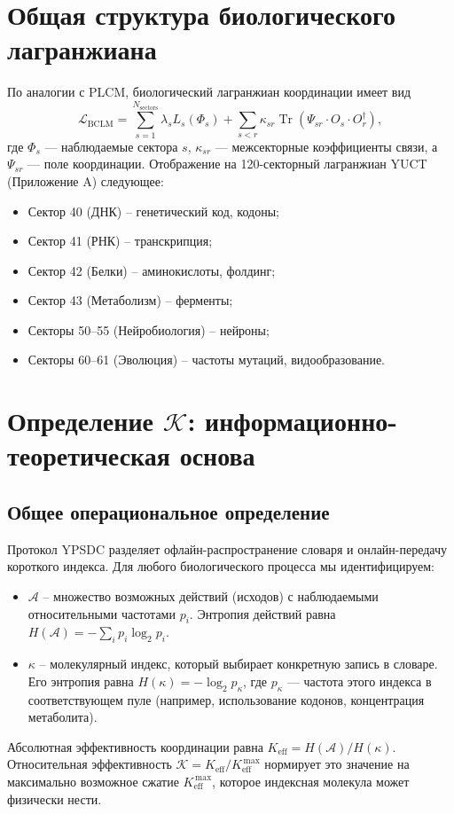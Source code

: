 \documentclass[12pt,a4paper]{article}
\newcommand{\REL}{\mathcal{K}}          %
\newcommand{\ABS}{K_{\mathrm{eff}}}     %
\begin{document}
	\section{Общая структура биологического лагранжиана}
	По аналогии с PLCM, биологический лагранжиан координации имеет вид
	\begin{equation}
		\mathcal{L}_{\text{BCLM}} = \sum_{s=1}^{N_{\text{sectors}}} \lambda_s L_s(\Phi_s) + \sum_{s<r} \kappa_{sr} \operatorname{Tr}(\Psi_{sr} \cdot O_s \cdot O_r^\dagger),
		\label{eq:BCLM}
	\end{equation}
	где \(\Phi_s\) — наблюдаемые сектора \(s\), \(\kappa_{sr}\) — межсекторные коэффициенты связи, а \(\Psi_{sr}\) — поле координации. Отображение на 120-секторный лагранжиан YUCT (Приложение A) следующее:
	\begin{itemize}
		\item Сектор 40 (ДНК) – генетический код, кодоны;
		\item Сектор 41 (РНК) – транскрипция;
		\item Сектор 42 (Белки) – аминокислоты, фолдинг;
		\item Сектор 43 (Метаболизм) – ферменты;
		\item Секторы 50–55 (Нейробиология) – нейроны;
		\item Секторы 60–61 (Эволюция) – частоты мутаций, видообразование.
	\end{itemize}
	
	\section{Определение \(\REL\): информационно-теоретическая основа}
	\label{sec:REL-def}
	
	\subsection{Общее операциональное определение}
	Протокол YPSDC разделяет офлайн-распространение словаря и онлайн-передачу короткого индекса. Для любого биологического процесса мы идентифицируем:
	\begin{itemize}
		\item \(\mathcal{A}\) – множество возможных действий (исходов) с наблюдаемыми относительными частотами \(p_i\). Энтропия действий равна \(H(\mathcal{A}) = -\sum_i p_i \log_2 p_i\).
		\item \(\kappa\) – молекулярный индекс, который выбирает конкретную запись в словаре. Его энтропия равна \(H(\kappa) = -\log_2 p_\kappa\), где \(p_\kappa\) — частота этого индекса в соответствующем пуле (например, использование кодонов, концентрация метаболита).
	\end{itemize}
	Абсолютная эффективность координации равна \(\ABS = H(\mathcal{A})/H(\kappa)\). Относительная эффективность \(\REL = \ABS / \ABS^{\,\max}\) нормирует это значение на максимально возможное сжатие \(\ABS^{\,\max}\), которое индексная молекула может физически нести.
	
\end{document}
